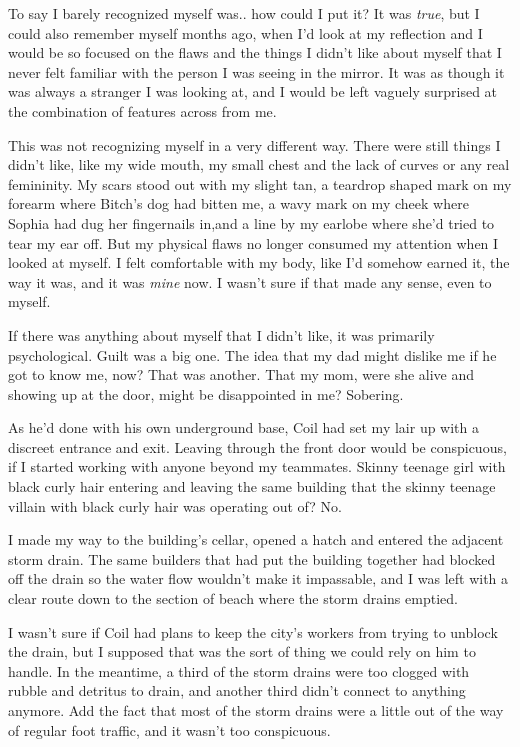 To say I barely recognized myself was.. how could I put it?  It was \emph{true}, but I could also remember myself months ago, when I'd look at my reflection and I would be so focused on the flaws and the things I didn't like about myself that I never felt familiar with the person I was seeing in the mirror.  It was as though it was always a stranger I was looking at, and I would be left vaguely surprised at the combination of features across from me.



This was not recognizing myself in a very different way.  There were still things I didn't like, like my wide mouth, my small chest and the lack of curves or any real femininity.  My scars stood out with my slight tan, a teardrop shaped mark on my forearm where Bitch's dog had bitten me, a wavy mark on my cheek where Sophia had dug her fingernails in,and a line by my earlobe where she'd tried to tear my ear off.  But my physical flaws no longer consumed my attention when I looked at myself. I felt comfortable with my body, like I'd somehow earned it, the way it was, and it was \emph{mine} now.  I wasn't sure if that made any sense, even to myself.



If there was anything about myself that I didn't like, it was primarily psychological.  Guilt was a big one.  The idea that my dad might dislike me if he got to know me, now?  That was another.  That my mom, were she alive and showing up at the door, might be disappointed in me?  Sobering.



As he'd done with his own underground base, Coil had set my lair up with a discreet entrance and exit.  Leaving through the front door would be conspicuous, if I started working with anyone beyond my teammates.  Skinny teenage girl with black curly hair entering and leaving the same building that the skinny teenage villain with black curly hair was operating out of?  No.



I made my way to the building's cellar, opened a hatch and entered the adjacent storm drain.  The same builders that had put the building together had blocked off the drain so the water flow wouldn't make it impassable, and I was left with a clear route down to the section of beach where the storm drains emptied.



I wasn't sure if Coil had plans to keep the city's workers from trying to unblock the drain, but I supposed that was the sort of thing we could rely on him to handle.  In the meantime, a third of the storm drains were too clogged with rubble and detritus to drain, and another third didn't connect to anything anymore.  Add the fact that most of the storm drains were a little out of the way of regular foot traffic, and it wasn't too conspicuous.



